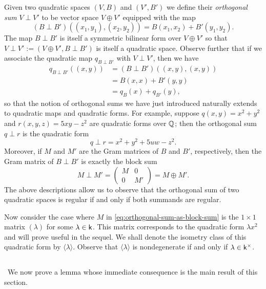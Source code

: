 Given two quadratic spaces \((V, B)\) and \((V', B')\) we define their \emph{orthogonal sum} \(V \perp V'\) to be vector space \(V \oplus V'\) equipped with the map\label{sec:orthogonal-sum}
\[ 
  (B \perp B')((x_1, y_1), (x_2, y_2)) = B(x_1, x_2) + B'(y_1, y_2).
\]
The map \(B \perp B'\) is itself a symmetric bilinear form over \(V \oplus V'\) so that \(V \perp V' := (V \oplus V', B \perp B')\) is itself a quadratic space. Observe further that if we associate the quadratic map \(q_{B \perp B'}\) with \(V \perp V'\), then we have
\begin{align*}
  q_{B \perp B'}((x, y)) &= (B \perp B')((x, y), (x, y))\\
  &= B(x, x) + B'(y, y)\\
  &= q_B(x) + q_{B'}(y),
\end{align*}
so that the notion of orthogonal sums we have just introduced naturally extends to quadratic maps and quadratic forms. For example, suppose \(q(x, y) = x^2 + y^2\) and \(r(x, y, z) = 5xy - z^2\) are quadratic forms over \(\mathbb{Q}\); then the orthogonal sum \(q \perp r\) is the quadratic form
\[
  q \perp r = x^2 + y^2 + 5uw - z^2.
\]
Moreover, if \(M\) and \(M'\) are the Gram matrices of \(B\) and \(B'\), respectively, then the Gram matrix of \(B \perp B'\) is exactly the block sum
\begin{equation}\label{eq:orthogonal-sum-as-block-sum}
  M \perp M' =
  \begin{pmatrix}
    M & 0 \\
    0 & M'
  \end{pmatrix}
  = M \oplus M'.
\end{equation}
The above descriptions allow us to observe that the orthogonal sum of two quadratic spaces is regular if and only if both summands are regular.

Now consider the case where \(M\) in \eqref{eq:orthogonal-sum-as-block-sum} is the \(1 \times 1\) matrix \((\lambda)\) for some \(\lambda \in \mathsf{k}\). This matrix corresponds to the quadratic form \(\lambda x^2\) and will prove useful in the sequel. We shall denote the isometry class of this quadratic form by \(\langle \lambda \rangle\). Observe that \(\langle \lambda \rangle\) is nondegenerate if and only if \(\lambda \in \mathsf{k}^{\times}\).

\subsection{}~We now prove a lemma whose immediate consequence is the main result of this section.\label{sec:diagonalization-of-forms}

